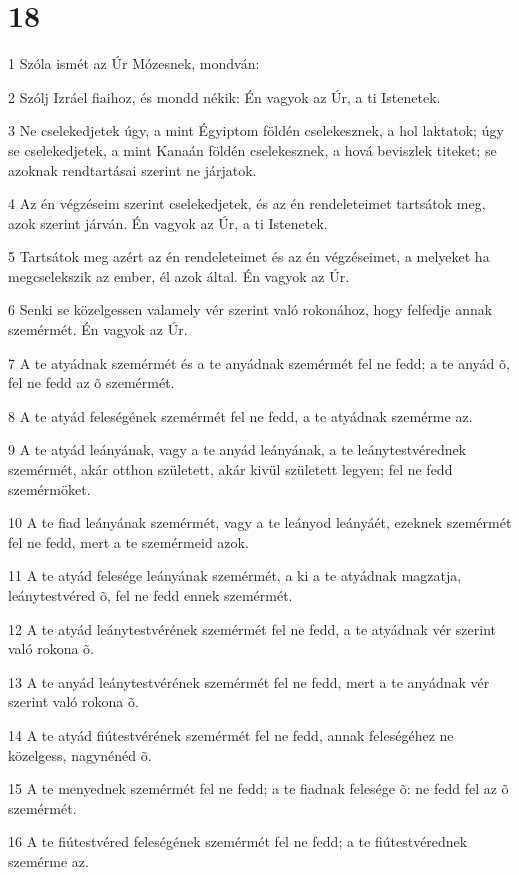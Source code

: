 \chapter{18}

\par 1 Szóla ismét az Úr Mózesnek, mondván:
\par 2 Szólj Izráel fiaihoz, és mondd nékik: Én vagyok az Úr, a ti Istenetek.
\par 3 Ne cselekedjetek úgy, a mint Égyiptom földén cselekesznek, a hol laktatok; úgy se cselekedjetek, a mint Kanaán földén cselekesznek, a hová beviszlek titeket; se azoknak rendtartásai szerint ne járjatok.
\par 4 Az én végzéseim szerint cselekedjetek, és az én rendeleteimet tartsátok meg, azok szerint járván. Én vagyok az Úr, a ti Istenetek.
\par 5 Tartsátok meg azért az én rendeleteimet és az én végzéseimet, a melyeket ha megcselekszik az ember, él azok által. Én vagyok az Úr.
\par 6 Senki se közelgessen valamely vér szerint való rokonához, hogy felfedje annak szemérmét. Én vagyok az Úr.
\par 7 A te atyádnak szemérmét és a te anyádnak szemérmét fel ne fedd; a te anyád õ, fel ne fedd az õ szemérmét.
\par 8 A te atyád feleségének szemérmét fel ne fedd, a te atyádnak szemérme az.
\par 9 A te atyád leányának, vagy a te anyád leányának, a te leánytestvérednek szemérmét, akár otthon született, akár kivül született legyen; fel ne fedd szemérmöket.
\par 10 A te fiad leányának szemérmét, vagy a te leányod leányáét, ezeknek szemérmét fel ne fedd, mert a te szemérmeid azok.
\par 11 A te atyád felesége leányának szemérmét, a ki a te atyádnak magzatja, leánytestvéred õ, fel ne fedd ennek szemérmét.
\par 12 A te atyád leánytestvérének szemérmét fel ne fedd, a te atyádnak vér szerint való rokona õ.
\par 13 A te anyád leánytestvérének szemérmét fel ne fedd, mert a te anyádnak vér szerint való rokona õ.
\par 14 A te atyád fiútestvérének szemérmét fel ne fedd, annak feleségéhez ne közelgess, nagynénéd õ.
\par 15 A te menyednek szemérmét fel ne fedd; a te fiadnak felesége õ: ne fedd fel az õ szemérmét.
\par 16 A te fiútestvéred feleségének szemérmét fel ne fedd; a te fiútestvérednek szemérme az.
